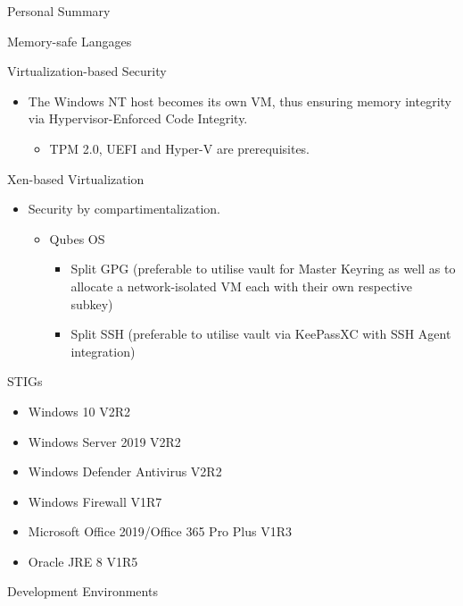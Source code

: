\documentclass[]{mcdowellcv}
\begin{document}
\begin{cvsection}{Personal Summary}
\begin{cvsubsection}{Memory-safe Langages}{}{}
\begin{itemize}
			\end{itemize}
		\end{cvsubsection}
		\begin{cvsubsection}{Virtualization-based Security}{}{}
			\begin{itemize}
				\item The Windows NT host becomes its own VM, thus ensuring memory integrity via Hypervisor-Enforced Code Integrity.
				\begin{itemize}
					\item TPM 2.0, UEFI and Hyper-V are prerequisites.
				\end{itemize}
			\end{itemize}
		\end{cvsubsection}
		\begin{cvsubsection}{Xen-based Virtualization}{}{}
			\begin{itemize}
				\item Security by compartimentalization.
				\begin{itemize}
					\item Qubes OS
					\begin{itemize}
						\item Split GPG (preferable to utilise vault for Master Keyring as well as to allocate a network-isolated VM each with their own respective subkey)
						\item Split SSH (preferable to utilise vault via KeePassXC with SSH Agent integration)
					\end{itemize}
				\end{itemize}
			\end{itemize}
		\end{cvsubsection}
		\begin{cvsubsection}{STIGs}{}{}
			\begin{itemize}
				\item Windows 10 V2R2
				\item Windows Server 2019 V2R2
				\item Windows Defender Antivirus V2R2
				\item Windows Firewall V1R7
				\item Microsoft Office 2019/Office 365 Pro Plus V1R3
				\item Oracle JRE 8 V1R5
			\end{itemize}
		\end{cvsubsection}
		\begin{cvsubsection}{Development Environments}{}{}
			\begin{itemize}

\end{itemize}
\end{cvsubsection}
\end{cvsection}
\end{document}
